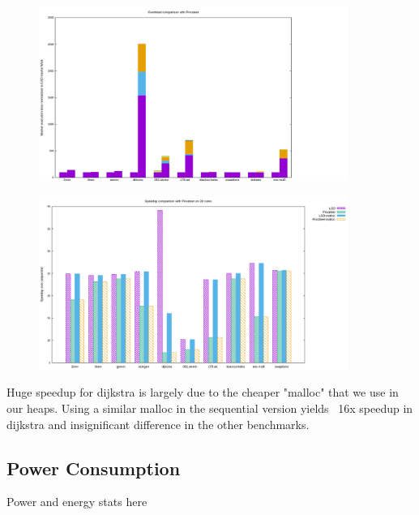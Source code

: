 \begin{figure}[htp]
  \includegraphics[width=0.9\textwidth]{figures/overheads}
\end{figure}
\begin{figure}[htp]
  \includegraphics[width=0.9\textwidth]{figures/comparison}
\end{figure}
Huge speedup for dijkstra is largely due to the cheaper "malloc" that
we use in our heaps. Using a similar malloc in the sequential version
yields ~16x speedup in dijkstra and insignificant difference in the
other benchmarks.

\subsection{Power Consumption}

Power and energy stats here

